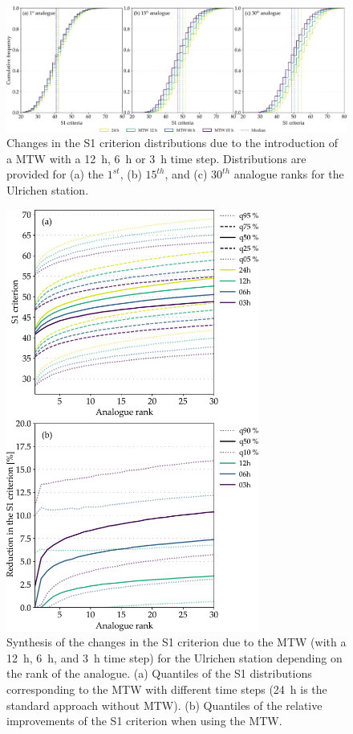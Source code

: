 \documentclass[hess, manuscript]{copernicus}
\begin{document}
	\begin{figure}[htb]
		\begin{center}
			\includegraphics[width=17cm]{fig05.pdf}
		\end{center}
		\caption{Changes in the S1 criterion distributions due to the introduction of a MTW with a 12~h, 6~h or 3~h time step. Distributions are provided for (a) the $1^{st}$, (b) $15^{th}$, and (c) $30^{th}$ analogue ranks for the Ulrichen station.}
		\label{fig:changes_S1_analogs}
	\end{figure}
	
	\begin{figure}[htb]
		\begin{center}
			\includegraphics[width=8.3cm]{fig06.pdf}
		\end{center}
		\caption{Synthesis of the changes in the S1 criterion due to the MTW (with a 12~h, 6~h, and 3~h time step) for the Ulrichen station depending on the rank of the analogue. (a) Quantiles of the S1 distributions corresponding to the MTW with different time steps (24~h is the standard approach without MTW). (b) Quantiles of the relative improvements of the S1 criterion when using the MTW.}
		\label{fig:changes_S1}
	\end{figure}
	
\end{document}
